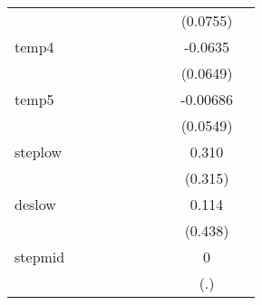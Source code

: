 {\begin{tabular}{l*{9}{c}}
            &                     &                     &                     &                     &                     &                     &                     &    (0.0755)         &                     \\
[1em]
temp4       &                     &                     &                     &                     &                     &                     &                     &     -0.0635         &                     \\
            &                     &                     &                     &                     &                     &                     &                     &    (0.0649)         &                     \\
[1em]
temp5       &                     &                     &                     &                     &                     &                     &                     &    -0.00686         &                     \\
            &                     &                     &                     &                     &                     &                     &                     &    (0.0549)         &                     \\
[1em]
steplow     &                     &                     &                     &                     &                     &                     &                     &       0.310         &                     \\
            &                     &                     &                     &                     &                     &                     &                     &     (0.315)         &                     \\
[1em]
deslow      &                     &                     &                     &                     &                     &                     &                     &       0.114         &                     \\
            &                     &                     &                     &                     &                     &                     &                     &     (0.438)         &                     \\
[1em]
stepmid     &                     &                     &                     &                     &                     &                     &                     &           0         &                     \\
            &                     &                     &                     &                     &                     &                     &                     &         (.)         &                     \\

\end{tabular}}
